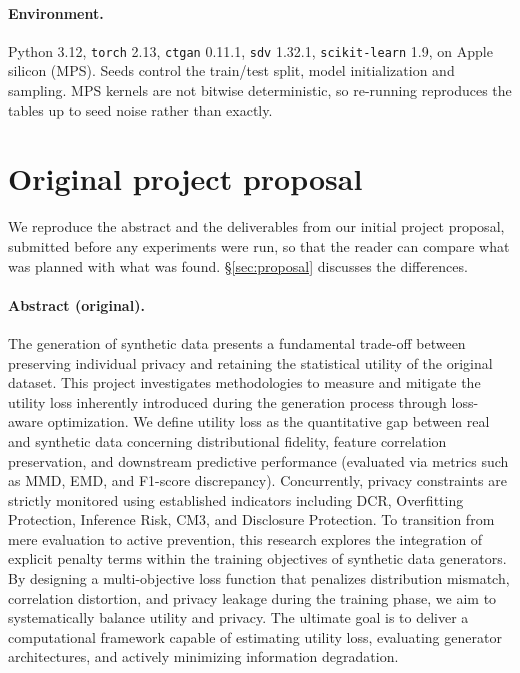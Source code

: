 \documentclass[11pt,a4paper]{article}
\begin{document}
\paragraph{Environment.} Python 3.12, \texttt{torch} 2.13, \texttt{ctgan} 0.11.1,
\texttt{sdv} 1.32.1, \texttt{scikit-learn} 1.9, on Apple silicon (MPS).
Seeds control the train/test split, model initialization and sampling. MPS
kernels are not bitwise deterministic, so re-running reproduces the tables up
to seed noise rather than exactly.

\section{Original project proposal}
\label{app:proposal}

We reproduce the abstract and the deliverables from our initial project
proposal, submitted before any experiments were run, so that the reader can
compare what was planned with what was found. \S\ref{sec:proposal} discusses
the differences.

\paragraph{Abstract (original).}
The generation of synthetic data presents a fundamental trade-off between
preserving individual privacy and retaining the statistical utility of the
original dataset. This project investigates methodologies to measure and
mitigate the utility loss inherently introduced during the generation process
through loss-aware optimization. We define utility loss as the quantitative
gap between real and synthetic data concerning distributional fidelity,
feature correlation preservation, and downstream predictive performance
(evaluated via metrics such as MMD, EMD, and F1-score discrepancy).
Concurrently, privacy constraints are strictly monitored using established
indicators including DCR, Overfitting Protection, Inference Risk, CM3, and
Disclosure Protection. To transition from mere evaluation to active
prevention, this research explores the integration of explicit penalty terms
within the training objectives of synthetic data generators. By designing a
multi-objective loss function that penalizes distribution mismatch,
correlation distortion, and privacy leakage during the training phase, we aim
to systematically balance utility and privacy. The ultimate goal is to deliver
a computational framework capable of estimating utility loss, evaluating
generator architectures, and actively minimizing information degradation.
\end{document}
